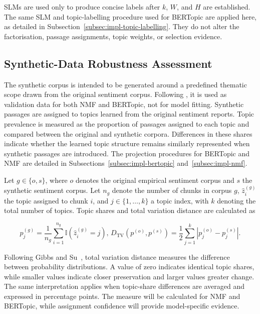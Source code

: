 SLMs are used only to produce concise labels after $k$, $W$, and $H$ are established.
The same SLM and topic-labelling procedure used for BERTopic are applied here, as
detailed in Subsection~\ref{subsec:impl-topic-labelling}. They do not alter the
factorisation, passage assignments, topic weights, or selection evidence.

\subsection{Synthetic-Data Robustness Assessment}
\label{subsec:method-synthetic-robustness}

The synthetic corpus is intended to be generated around a predefined thematic scope
drawn from the original sentiment corpus. Following \cite{shi2019evaluation}, it is
used as validation data for both NMF and BERTopic, not for model fitting. Synthetic
passages are assigned to topics learned from the original sentiment reports. Topic
prevalence is measured as the proportion of passages assigned to each topic and
compared between the original and synthetic corpora. Differences in these shares
indicate whether the learned topic structure remains similarly represented when
synthetic passages are introduced. The projection procedures for BERTopic and NMF are
detailed in Subsections~\ref{subsec:impl-bertopic} and~\ref{subsec:impl-nmf}.


{\color{blue}
Let \(g\in\{o,s\}\), where \(o\) denotes the original empirical sentiment corpus
and \(s\) the synthetic sentiment corpus. Let \(n_g\) denote the number of chunks
in corpus \(g\), \(\widehat{z}_{i}^{(g)}\) the topic assigned to chunk \(i\), and
\(j\in\{1,\ldots,k\}\) a topic index, with \(k\) denoting the total number of
topics. Topic shares and total variation distance are calculated as
}

\begin{equation}
p_{j}^{(g)}
=
\frac{1}{n_g}
\sum_{i=1}^{n_g}
\mathbb{I}\!\left(\widehat{z}_{i}^{(g)}=j\right),
\,
D_{\mathrm{TV}}\!\left(p^{(o)},p^{(s)}\right)
=
\frac{1}{2}
\sum_{j=1}^{k}
\left|p_{j}^{(o)}-p_{j}^{(s)}\right|.
\label{eq:method-synthetic-robustness}
\end{equation}

Following Gibbs and Su~\cite{gibbs2002choosing}, total variation distance measures
the difference between probability distributions. A value of zero indicates identical
topic shares, while smaller values indicate closer preservation and larger values
greater change. The same interpretation applies when topic-share differences are
averaged and expressed in percentage points. The measure will be calculated for NMF
and BERTopic, while assignment confidence will provide model-specific evidence.

